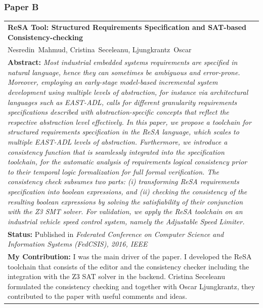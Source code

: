 \subsubsection{Paper B}
\begin{tabular}{p{\textwidth}}
\textbf{ReSA Tool: Structured Requirements Specification and SAT-based Consistency-checking}\\%
Nesredin~Mahmud, Cristina~Seceleanu, Ljungkrantz~Oscar\\[6pt]%
\textbf{Abstract:} \textit{Most industrial embedded systems requirements are
specified in natural language, hence they can sometimes be
ambiguous and error-prone. Moreover, employing an early-stage
model-based incremental system development using multiple
levels of abstraction, for instance via architectural languages
such as EAST-ADL, calls for different granularity requirements
specifications described with abstraction-specific concepts that
reflect the respective abstraction level effectively.
In this paper, we propose a toolchain for structured requirements
specification in the ReSA language, which scales to multiple
EAST-ADL levels of abstraction. Furthermore, we introduce
a consistency function that is seamlessly integrated into the
specification toolchain, for the automatic analysis of requirements
logical consistency prior to their temporal logic formalization
for full formal verification. The consistency check subsumes
two parts: (i) transforming ReSA requirements specification into
boolean expressions, and (ii) checking the consistency of the
resulting boolean expressions by solving the satisfiability of their
conjunction with the Z3 SMT solver. For validation, we apply
the ReSA toolchain on an industrial vehicle speed control system,
namely the Adjustable Speed Limiter.}\\[6pt]%
\textbf{Status: }Published in \textit{Federated Conference on Computer Science and Information Systems (FedCSIS), 2016, IEEE}\\%
\textbf{My Contribution: }I was the main driver of the paper. I developed the ReSA toolchain that consists of the editor and the consistency checker including the integration with the Z3 SAT solver in the backend. Cristina Seceleanu formulated the consistency checking and together with Oscar Ljungkrantz, they contributed to the paper with useful comments and ideas.\\%
\end{tabular}

